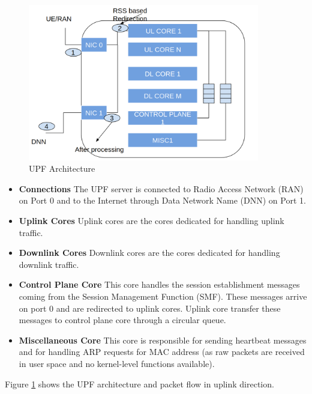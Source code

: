 
\begin{figure}[htbp]
    \centering
    \includegraphics[width=0.9\textwidth, keepaspectratio]{./fig/Introduction/UPF2.png}
    \caption{UPF Architecture}
    \label{figUPF}
\end{figure}
\begin{itemize}
        \item \textbf{Connections} The UPF server is connected to Radio Access Network (RAN) on Port 0 
        and to the Internet through Data Network Name (DNN) on Port 1.
        \item \textbf{Uplink Cores}  Uplink cores are the cores dedicated for handling uplink traffic.
        \item \textbf{Downlink Cores}         Downlink cores are the cores dedicated for handling downlink traffic.
        \item \textbf{Control Plane Core} This core handles the session establishment messages coming from the 
        Session Management Function (SMF). These messages arrive on port 0 and are redirected to uplink cores. 
        Uplink core transfer these messages to control plane core through a circular queue.
        \item \textbf{Miscellaneous Core} This core is responsible for sending heartbeat messages and for handling ARP requests for MAC address (as raw packets are received in  user space and no kernel-level functions available).
\end{itemize}
Figure \ref{figUPF} shows the UPF architecture and packet flow in uplink direction. 